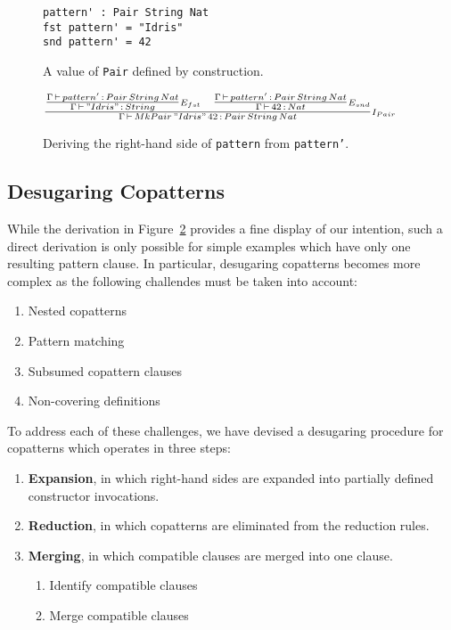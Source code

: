 \begin{figure}
\begin{lstlisting}
pattern' : Pair String Nat
fst pattern' = "Idris"
snd pattern' = 42
\end{lstlisting}
  \caption{A value of \texttt{Pair} defined by construction.}
  \label{fig:pair_example_copatterns}
\end{figure}

\begin{figure}
  \centering
$\frac { \begin{matrix} \frac { \Gamma \, \vdash \,pattern'\, :\,
      Pair\, String\, Nat }{ \Gamma \, \vdash \, "Idris"\,:\,String
    } \scriptstyle E_{fst}   & \frac { \Gamma \, \vdash \,pattern'\, :\, Pair\, String\,
      Nat }{ \Gamma \, \vdash \, 42\,:\,Nat } \scriptstyle E_{snd}  \end{matrix} }{
  \Gamma \, \vdash \, MkPair\, "Idris"\, 42\, :\, Pair\, String\, Nat } \scriptstyle I_{ Pair }$
  \caption{Deriving the right-hand side of \texttt{pattern} from \texttt{pattern'}.}
  \label{fig:pair_elimination_on_introduction_rules_rewrite}
\end{figure}

\subsection{Desugaring Copatterns}
While the derivation in
Figure~\ref{fig:pair_elimination_on_introduction_rules_rewrite} provides a fine
display of our intention, such a direct derivation is only possible for simple
examples which have only one resulting pattern clause. In particular, desugaring
copatterns becomes more complex as the following challendes must be taken into account:

\begin{enumerate}
\item Nested copatterns
\item Pattern matching
\item Subsumed copattern clauses
\item Non-covering definitions
\end{enumerate}

To address each of these challenges, we have devised a desugaring procedure for
copatterns which operates in three steps:

\begin{enumerate}
\item \textbf{Expansion}, in which right-hand sides are expanded into partially
  defined constructor invocations.
\item \textbf{Reduction}, in which copatterns are eliminated from the reduction rules.
\item \textbf{Merging}, in which compatible clauses are merged into one clause.
  \begin{enumerate}
  \item Identify compatible clauses
  \item Merge compatible clauses
  \end{enumerate}
\end{enumerate}

